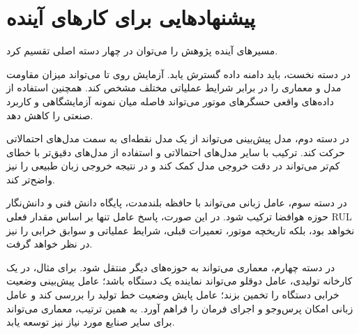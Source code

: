 

\section{پیشنهادهایی برای کارهای آینده}
\label{sec:future-work-final}

مسیرهای آینده پژوهش را می‌توان در چهار دسته اصلی تقسیم کرد.

در دسته نخست، باید دامنه داده گسترش یابد. آزمایش روی  تا  می‌تواند میزان مقاومت مدل و معماری را در برابر شرایط عملیاتی مختلف مشخص کند. همچنین استفاده از داده‌های واقعی حسگرهای موتور می‌تواند فاصله میان نمونه آزمایشگاهی و کاربرد صنعتی را کاهش دهد.

در دسته دوم، مدل پیش‌بینی می‌تواند از یک مدل نقطه‌ای به سمت مدل‌های احتمالاتی حرکت کند. ترکیب  با سایر مدل‌های احتمالاتی و استفاده از مدل‌های دقیق‌تر با خطای کم‌تر می‌تواند در دقت خروجی مدل کمک کند و در نتیجه خروجی زبان طبیعی را نیز واضح‌تر کند.

در دسته سوم، عامل زبانی می‌تواند با حافظه بلندمدت، پایگاه دانش فنی و دانش‌نگار حوزه هوافضا ترکیب شود. در این صورت، پاسخ عامل تنها بر اساس مقدار فعلی \gls{RUL} نخواهد بود، بلکه تاریخچه موتور، تعمیرات قبلی، شرایط عملیاتی و سوابق خرابی را نیز در نظر خواهد گرفت.

در دسته چهارم، معماری می‌تواند به حوزه‌های دیگر منتقل شود. برای مثال، در یک کارخانه تولیدی، عامل دوقلو می‌تواند نماینده یک دستگاه  باشد؛ عامل پیش‌بینی وضعیت خرابی دستگاه را تخمین بزند؛ عامل پایش وضعیت خط تولید را بررسی کند و عامل زبانی امکان پرس‌وجو و اجرای فرمان را فراهم آورد. به همین ترتیب، معماری می‌تواند برای سایر صنایع مورد نیاز نیز توسعه یابد.

